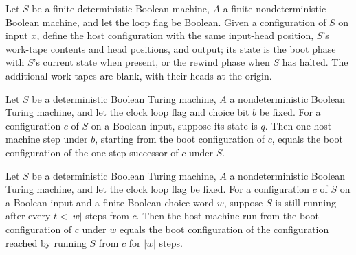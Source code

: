 \begin{definition}
\label{Turing.ClockHost.bootCfg}
\leanok
{}
Let $S$ be a finite deterministic Boolean machine, $A$ a finite nondeterministic Boolean
machine, and let the loop flag be Boolean. Given a configuration of $S$ on input $x$,
define the host configuration with the same input-head position, $S$'s work-tape
contents and head positions, and output; its state is the boot phase with $S$'s current
state when present, or the rewind phase when $S$ has halted. The additional work tapes
are blank, with their heads at the origin.
\end{definition}

\begin{theorem}
\label{Turing.ClockHost.boot_step}
\leanok
{}
Let $S$ be a deterministic Boolean Turing machine, $A$ a nondeterministic Boolean Turing
machine, and let the clock loop flag and choice bit $b$ be fixed. For a configuration
$c$ of $S$ on a Boolean input, suppose its state is $q$. Then one host-machine step
under $b$, starting from the boot configuration of $c$, equals the boot configuration of
the one-step successor of $c$ under $S$.
\end{theorem}

\begin{theorem}
\label{Turing.ClockHost.boot_run}
\leanok
{}
Let $S$ be a deterministic Boolean Turing machine, $A$ a nondeterministic Boolean Turing
machine, and let the clock loop flag be fixed. For a configuration $c$ of $S$ on a
Boolean input and a finite Boolean choice word $w$, suppose $S$ is still running after
every $t<|w|$ steps from $c$. Then the host machine run from the boot configuration of
$c$ under $w$ equals the boot configuration of the configuration reached by running $S$
from $c$ for $|w|$ steps.
\end{theorem}

